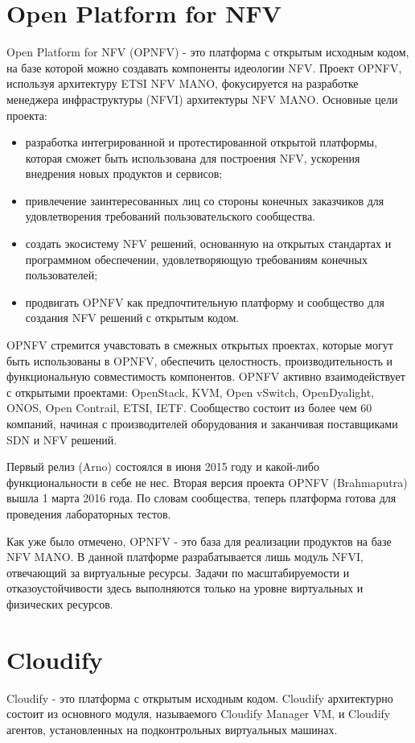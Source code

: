 \documentclass[oneside,final,14pt,a4paper]{extreport}
\begin{document}
\section{Open Platform for NFV}
Open Platform for NFV (OPNFV) - это платформа с открытым исходным кодом, на базе которой можно создавать компоненты  идеологии NFV. Проект OPNFV, используя архитектуру ETSI NFV MANO, фокусируется на разработке менеджера инфраструктуры (NFVI) архитектуры NFV MANO.\cite{opnfv-official}
Основные цели проекта:
\begin{itemize}
	\item разработка интегрированной и протестированной открытой платформы, которая сможет быть использована для построения NFV, ускорения внедрения новых продуктов и сервисов;
	\item привлечение заинтересованных лиц со стороны конечных заказчиков для удовлетворения требований пользовательского сообщества.
	\item создать экосистему NFV решений, основанную на открытых стандартах и программном обеспечении, удовлетворяющую требованиям конечных пользователей;
	\item продвигать OPNFV как предпочтительную платформу и сообщество для создания NFV решений с открытым кодом.
\end{itemize}

OPNFV стремится учавстовать в смежных открытых проектах, которые могут быть использованы в OPNFV, обеспечить целостность, производительность и функциональную совместимость компонентов. OPNFV активно взаимодействует с открытыми проектами: OpenStack, KVM, Open vSwitch, OpenDyalight, ONOS, Open Contrail, ETSI, IETF. Сообщество состоит из более чем 60 компаний, начиная с производителей оборудования и заканчивая поставщиками SDN и NFV решений.

Первый релиз (Arno) состоялся в июня 2015 году и какой-либо функциональности в себе не нес. Вторая версия проекта OPNFV (Brahmaputra) вышла 1 марта 2016 года. По словам сообщества, теперь платформа готова для проведения лабораторных тестов.\cite{opnfv-state1}

Как уже было отмечено, OPNFV - это база для реализации продуктов на базе NFV MANO. В данной платформе разрабатывается лишь модуль NFVI, отвечающий за виртуальные ресурсы. Задачи по масштабируемости и отказоустойчивости здесь выполняются только на уровне виртуальных и физических ресурсов.


\section{Cloudify}
Cloudify - это платформа с открытым исходным кодом. Cloudify архитектурно состоит из основного модуля, называемого Cloudify Manager VM, и Cloudify агентов, установленных на подконтрольных виртуальных машинах. 
\end{document}
